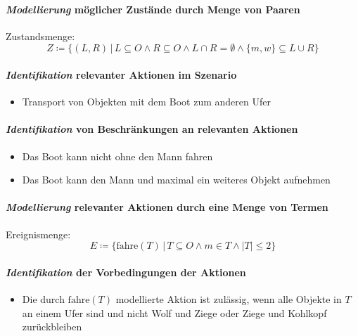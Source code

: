 \documentclass[a4paper, 11pt, accentcolor = tud3b]{tudreport}
\newcommand{\forwhich}{\ensuremath{{\,\vert\,}}}
\newcommand{\abs}[1]{\ensuremath{{\lvert #1 \rvert}}}
\begin{document}
			    \paragraph{\textit{Modellierung} möglicher Zustände durch Menge von Paaren}
				    Zustandsmenge:
				    \[ Z \coloneqq \{ (L, R) \forwhich L \subseteq O \land R \subseteq O \land L \cap R = \emptyset \land \{ m, w \} \subseteq L \cup R \} \]
			    
			    \paragraph{\textit{Identifikation} relevanter Aktionen im Szenario}
				    \begin{itemize}
				    	\item Transport von Objekten mit dem Boot zum anderen Ufer
				    \end{itemize}
			    
			    \paragraph{\textit{Identifikation} von Beschränkungen an relevanten Aktionen}
				    \begin{itemize}
				    	\item Das Boot kann nicht ohne den Mann fahren
				    	\item Das Boot kann den Mann und maximal ein weiteres Objekt aufnehmen
				    \end{itemize}
			    
			    \paragraph{\textit{Modellierung} relevanter Aktionen durch eine Menge von Termen}
				    Ereignismenge:
				    \[ E \coloneqq \{ \text{fahre}(T) \forwhich T \subseteq O \land m \in T \land \abs{T} \leq 2 \} \]
			    
			    \paragraph{\textit{Identifikation} der Vorbedingungen der Aktionen}
				    \begin{itemize}
				    	\item Die durch $ \text{fahre}(T) $ modellierte Aktion ist zulässig, wenn alle Objekte in $ T $ an einem Ufer sind und nicht Wolf und Ziege oder Ziege und Kohlkopf zurückbleiben
				    \end{itemize}
			    
\end{document}
